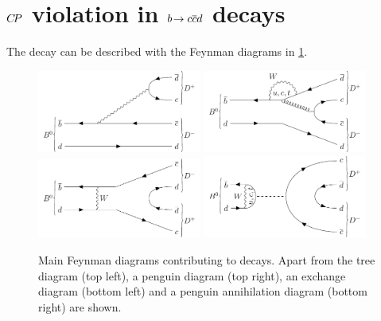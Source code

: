 
\section{\texorpdfstring{${C\!P}$}{CP} violation in \texorpdfstring{${b}\!\rightarrow {\ensuremath{c}}{\ensuremath{\overline {{c}}}}{\ensuremath{d}}$}{bToccbard} decays}
\label{sec:cpviolation:btoccbard}

The decay \BdToDD can be described with the Feynman diagrams in
\cref{fig:cpviolation:feynmandiagrams_bdtodd}.
\begin{figure}[htb]
\centering
\includegraphics[width=0.48\textwidth]{03-CPViolation/tikz/pdf/BdToDD_Tree.pdf}
\includegraphics[width=0.48\textwidth]{03-CPViolation/tikz/pdf/BdToDD_Penguin.pdf}
\includegraphics[width=0.48\textwidth]{03-CPViolation/tikz/pdf/BdToDD_Exchange.pdf}
\includegraphics[width=0.48\textwidth]{03-CPViolation/tikz/pdf/BdToDD_Annihilation.pdf}
\caption{Main Feynman diagrams contributing to \BdToDD decays. Apart from the
tree diagram (top left), a penguin diagram (top right), an exchange diagram
(bottom left) and a penguin annihilation diagram (bottom right) are shown.}
\label{fig:cpviolation:feynmandiagrams_bdtodd}
\end{figure}

